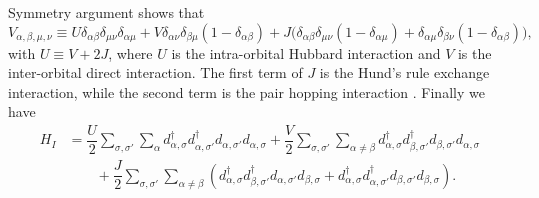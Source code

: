 \documentclass[10pt,nofootinbib]{revtex4}
\begin{document}
			{\color{red}Symmetry argument \cite{coury2016hubbard,castellani1978magnetic}} shows that
			\begin{equation}\label{2.1.4}
				V_{\alpha,\beta,\mu,\nu}\equiv U\delta_{\alpha \beta}\delta_{\mu \nu}\delta_{\alpha \mu}+V\delta_{\alpha\nu}\delta_{\beta\mu}(1-\delta_{\alpha \beta})+J\bigg(\delta_{\alpha \beta}\delta_{\mu\nu}(1-\delta_{\alpha\mu})+\delta_{\alpha\mu}\delta_{\beta\nu}(1-\delta_{\alpha\beta})\bigg),
			\end{equation}
			with $U\equiv V+2J$, where $U$ is the intra-orbital Hubbard interaction and $V$ is the inter-orbital direct interaction. The first term of $J$ is the Hund's rule exchange interaction, while the second term is the pair hopping interaction \cite{You-Kitaev}. Finally we have
			\begin{align}
				H_I&=\dfrac{U}{2}\sum_{\sigma,\sigma'}\sum_\alpha d_{\alpha,\sigma}^\dagger d_{\alpha,\sigma'}^\dagger d_{\alpha,\sigma'}d_{\alpha,\sigma}+\dfrac{V}{2}\sum_{\sigma,\sigma'}\sum_{\alpha\neq\beta} d_{\alpha,\sigma}^\dagger d_{\beta,\sigma'}^\dagger d_{\beta,\sigma'}d_{\alpha,\sigma}\nonumber\\
				&\qquad+\dfrac{J}{2}\sum_{\sigma,\sigma'}\sum_{\alpha\neq\beta}\left(d_{\alpha,\sigma}^\dagger d_{\beta,\sigma'}^\dagger d_{\alpha,\sigma'}d_{\beta,\sigma}+d_{\alpha,\sigma}^\dagger d_{\alpha,\sigma'}^\dagger d_{\beta,\sigma'}d_{\beta,\sigma}\right).\label{2.1.5}
			\end{align}
		
\end{document}
